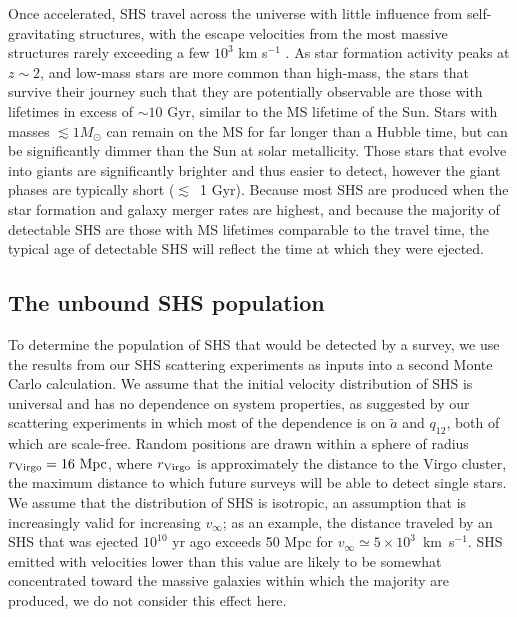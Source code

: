\documentclass[a4paper,twocolumn]{emulateapj}
\begin{document}
{Once accelerated, SHS travel across the universe with little influence from self-gravitating structures, with the escape velocities from the most massive structures rarely exceeding a few $10^{3}$ km s$^{-1}$ \citep[as an example, the Phoenix cluster, one of the most massive known clusters, has an escape velocity of $\sim$~3,000~km~s$^{-1}$,][]{McDonald:2012a}. As star formation activity peaks at $z \sim 2$, and low-mass stars are more common than high-mass, the stars that survive their journey such that they are potentially observable are those with lifetimes in excess of $\sim 10$ Gyr, similar to the MS lifetime of the Sun. Stars with masses $\lesssim 1 M_{\odot}$ can remain on the MS for far longer than a Hubble time, but can be  significantly dimmer than the Sun at solar metallicity. Those stars that evolve into giants are significantly brighter and thus easier to detect, however the giant phases are typically short ($\lesssim$~1 Gyr). Because most SHS are produced when the star formation and galaxy merger rates are highest, and because the majority of detectable SHS are those with MS lifetimes comparable to the travel time, the typical age of detectable SHS will reflect the time at which they were ejected.

\subsection{The unbound SHS population}
To determine the population of SHS that would be detected by a survey, we use the results from our SHS scattering experiments as inputs into a second Monte Carlo calculation. We assume that the initial velocity distribution of SHS is universal and has no dependence on system properties, as suggested by our scattering experiments in which most of the dependence is on $\tilde{a}$ and $q_{12}$, both of which are scale-free. Random positions are drawn within a sphere of radius $r_{\rm Virgo} = 16~{\rm Mpc}$, where $r_{\rm Virgo}$ is approximately the distance to the Virgo cluster, the maximum distance to which future surveys will be able to detect single stars. We assume that the distribution of SHS is isotropic, an assumption that is increasingly valid for increasing $v_{\infty}$; as an example, the distance traveled by an SHS that was ejected $10^{10}$ yr ago exceeds 50 Mpc for $v_{\infty} \simeq 5 \times 10^{3}$~km~s$^{-1}$. SHS emitted with velocities lower than this value are likely to be somewhat concentrated toward the massive galaxies within which the majority are produced, we do not consider this effect here.

}
\end{document}
